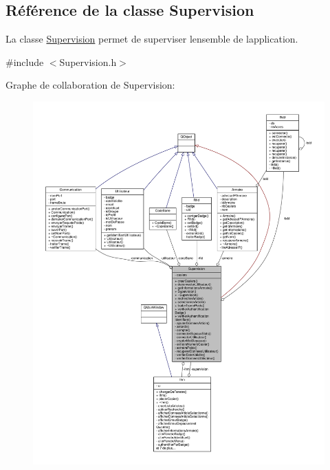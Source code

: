 \hypertarget{class_supervision}{}\subsection{Référence de la classe Supervision}
\label{class_supervision}


La classe \hyperlink{class_supervision}{Supervision} permet de superviser l\textquotesingle{}ensemble de l\textquotesingle{}application.  




{\ttfamily \#include $<$Supervision.\+h$>$}



Graphe de collaboration de Supervision\+:
\nopagebreak
\begin{figure}[H]
\begin{center}
\leavevmode
\includegraphics[width=350pt]{class_supervision__coll__graph}
\end{center}
\end{figure}
